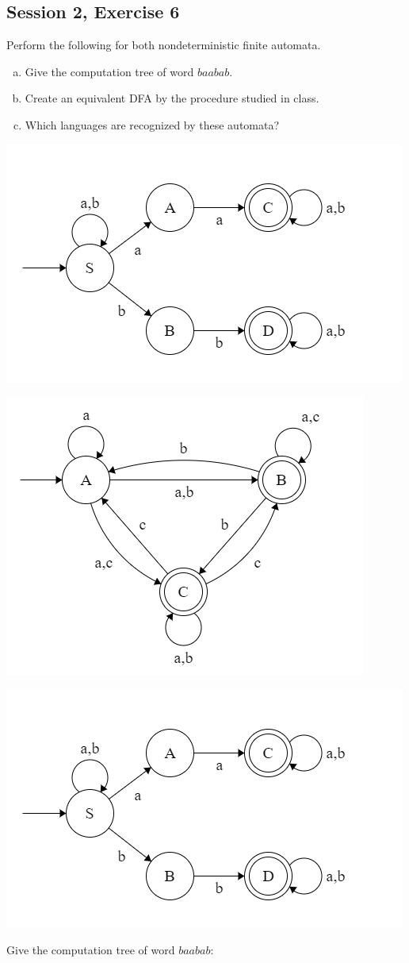 \subsection{Session 2, Exercise 6}


Perform the following for both nondeterministic finite automata.
\begin{enumerate}[a.)]
    \item Give the computation tree of word $baabab$.
    \item Create an equivalent DFA by the procedure studied in class.
    \item Which languages are recognized by these automata?
\end{enumerate}

\includegraphics[width=0.5\linewidth]{02/2_6_1_automaton.png}

\includegraphics[width=0.5\linewidth]{02/2_6_2_automaton.png}


\includegraphics[width=0.5\linewidth]{02/2_6_1_automaton.png}

Give the computation tree of word $baabab$:

